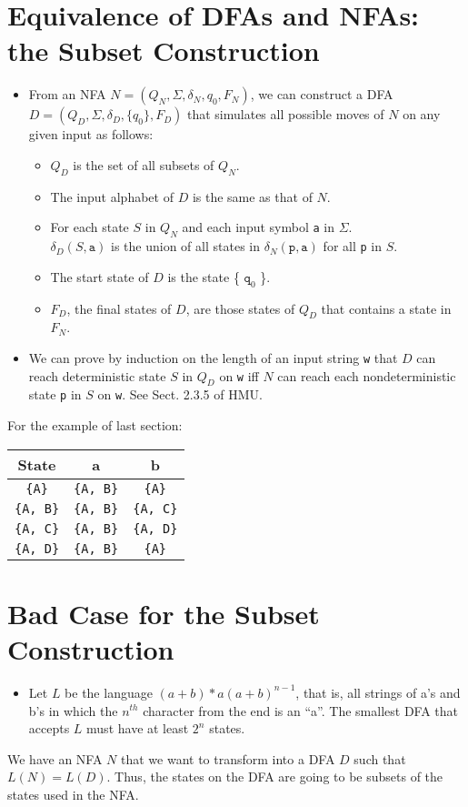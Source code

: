 \documentclass[]{article}
\begin{document}
\section{Equivalence of DFAs and NFAs: the Subset Construction}
  \begin{itemize}
    \item From an NFA $N = (Q_N, \Sigma, \delta_N, q_0, F_N)$, we can
    construct a DFA $D = (Q_D, \Sigma, \delta_D, \{q_0\}, F_D)$ that simulates
    all possible moves of $N$ on any given input as follows:
      \begin{itemize}
        \item $Q_D$ is the set of all subsets of $Q_N$.
        \item The input alphabet of $D$ is the same as that of $N$.
        \item For each state $S$ in $Q_N$ and each input symbol \texttt{a} in
        $\Sigma$. \\
        $\delta_D(S, \texttt{a})$ is the union of all states in $\delta_N(
        \texttt{p}, \texttt{a})$ for all \texttt{p} in $S$.
        \item The start state of $D$ is the state \{ $\texttt{q}_0$ \}.
        \item $F_D$, the final states of $D$, are those states of $Q_D$ that
        contains a state in $F_N$.
      \end{itemize}
    \item We can prove by induction on the length of an input string
    \texttt{w}
    that $D$ can reach deterministic state $S$ in $Q_D$ on \texttt{w} iff $N$
    can reach each nondeterministic state \texttt{p} in $S$ on \texttt{w}. See
    Sect. 2.3.5 of HMU.
  \end{itemize}
  For the example of last section: \\
    \begin{tabular}{c|c c }
       State             & a                 & b                 \\ \hline
       \texttt{\{A\}}    & \texttt{\{A, B\}} & \texttt{\{A\}}    \\
       \texttt{\{A, B\}} & \texttt{\{A, B\}} & \texttt{\{A, C\}} \\
       \texttt{\{A, C\}} & \texttt{\{A, B\}} & \texttt{\{A, D\}} \\
       \texttt{\{A, D\}} & \texttt{\{A, B\}} & \texttt{\{A\}}    \\
    \end{tabular}


\section{Bad Case for the Subset Construction}
  \begin{itemize}
    \item Let $L$ be the language $(a + b)*a(a+b)^{n-1}$, that is, all strings
    of a's and b's in which the $n^{th}$ character from the end is an ``a''.
    The smallest DFA that accepts $L$ must have at least $2^n$ states.
  \end{itemize}
  We have an NFA $N$ that we want to transform into a DFA $D$ such that
  $L(N) = L(D)$. Thus, the states on the DFA are going to be subsets of the
  states used in the NFA.
\end{document}
